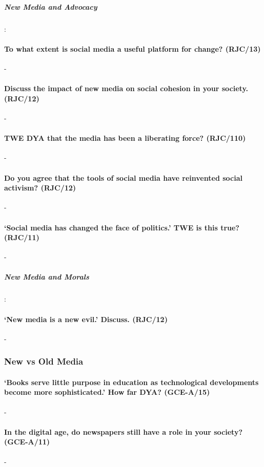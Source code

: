 \documentclass[../../main]{subfiles}
\begin{document}
\subparagraph{New Media and Advocacy} :

\paragraph{To what extent is social media a useful platform for change? (RJC/13)}-

\paragraph{Discuss the impact of new media on social cohesion in your society. (RJC/12)}-

\paragraph{TWE DYA that the media has been a liberating force? (RJC/110)}-

\paragraph{Do you agree that the tools of social media have reinvented social activism? (RJC/12)}-

\paragraph{`Social media has changed the face of politics.' TWE is this true? (RJC/11)}-

\subparagraph{New Media and Morals} :

\paragraph{`New media is a new evil.' Discuss. (RJC/12)}-

\subsubsection{New vs Old Media}

\paragraph{`Books serve little purpose in education as technological developments become more sophisticated.' How far DYA? (GCE-A/15)}-

\paragraph{In the digital age, do newspapers still have a role in your society? (GCE-A/11)}-
\end{document}
